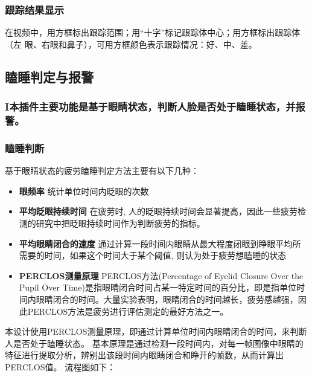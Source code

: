 \documentclass[12pt,hyperref,a4paper,UTF8]{ctexart}
\begin{document}
        \subsubsection*{\large \textbf{跟踪结果显示}}
在视频中，用方框标出跟踪范围；用“十字”标记跟踪体中心；用方框标出跟踪体（左
眼、右眼和鼻子），可用方框颜色表示跟踪情况：好、中、差。





        \subsection{瞌睡判定与报警}

        \subsubsection*{\textrm{I}本插件主要功能是基于眼睛状态，判断人脸是否处于瞌睡状态，并报警。}
 
        \subsubsection*{\large \textbf{瞌睡判断}}

        基于眼睛状态的疲劳瞌睡判定方法主要有以下几种：
        \begin{itemize}
            \item \textbf{眼频率}    统计单位时间内眨眼的次数
            \item \textbf{平均眨眼持续时间}  在疲劳时, 人的眨眼持续时间会显著提高，因此一些疲劳检测的研究中把眨眼持续时间作为判断疲劳的指标。
            \item \textbf{平均眼睛闭合的速度}  通过计算一段时间内眼睛从最大程度闭眼到睁眼平均所需要的时间，如果这个时间大于某个阈值, 则认为处于疲劳想瞌睡的状态
            \item \textbf{PERCLOS测量原理}  PERCLOS方法(Percentage of Eyelid Closure Over the Pupil Over Time)是指眼睛闭合时间占某一特定时间的百分比，即是指单位时间内眼睛闭合的时间。大量实验表明，眼睛闭合的时间越长，疲劳感越强，因此PERCLOS方法是疲劳进行评估测定的最好方法之一。
        \end{itemize}

        本设计使用PERCLOS测量原理，即通过计算单位时间内眼睛闭合的时间，来判断人是否处于瞌睡状态。
        基本原理是通过检测一段时间内，对每一帧图像中眼睛的特征进行提取分析，辨别出该段时间内眼睛闭合和睁开的帧数，从而计算出PERCLOS值。
        流程图如下：
\end{document}
